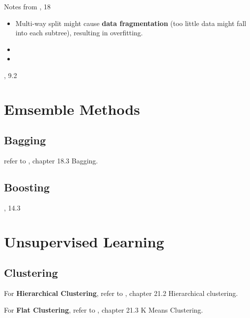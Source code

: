 \documentclass[8pt,letterpaper]{book}
\begin{document}
Notes from \cite{Murphy22}, 18 \newline
\begin{itemize}
    \item Multi-way split might cause \textbf{data fragmentation} (too little data might fall into each subtree), resulting in overfitting.
    \item 
    \item 
\end{itemize}


\cite{HasTibFri17}, 9.2 \newline

\chapter{Emsemble Methods}
\section{Bagging}
refer to \cite{Murphy22}, chapter 18.3 Bagging. \newline
\section{Boosting}
\cite{Bishop06}, 14.3 \newline

\chapter{Unsupervised Learning}
\section{Clustering}
For \textbf{Hierarchical Clustering}, refer to \cite{Murphy22}, chapter 21.2 Hierarchical clustering. \newline

For \textbf{Flat Clustering}, refer to \cite{Murphy22}, chapter 21.3 K Means Clustering. \newline


\end{document}
